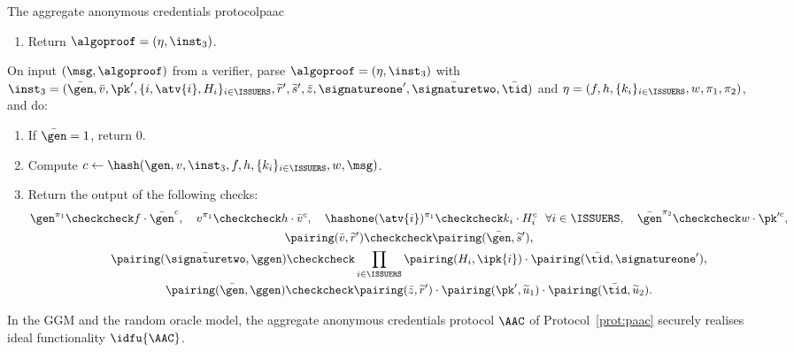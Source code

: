 \begin{protocolbox}{The aggregate anonymous credentials protocol}{paac}
\begin{description}
\begin{enumerate}
      \item Return $\algoproof = (\eta, \inst_3)$.

    \end{enumerate}

  \item[$\{0,1\} \leftarrow \AACverify(\crs,\msg,\algoproof)$ :] On input
$(\msg,\algoproof)$ from a verifier, parse $\algoproof = (\eta, \inst_3)$ with
$\inst_3 = (\bar{\gen}, \bar{v}, \pk', \{i, \atv{i}, H_i\}_{i\in\ISSUERS},
\widetilde{r}', \widetilde{s}', \bar{z}, \signatureone', \bar{\signaturetwo},
\bar{\tid})$ and $\eta = (f, h, \{k_i\}_{i \in \ISSUERS}, w, \pi_1, \pi_2)$, and do:

    \begin{enumerate}

      \item If $\bar{\gen} = 1$, return $0$.

      \item Compute $c \leftarrow \hash(\gen, v, \inst_3, f, h, \{k_i\}_{i \in
\ISSUERS}, w, \msg)$.

      \item Return the output of the following checks:
	\begin{gather*}
	  \gen^{\pi_1} \checkcheck f\cdot\bar{\gen}^c, \quad v^{\pi_1}
\checkcheck h\cdot\bar{v}^c, \quad \hashone(\atv{i})^{\pi_1} \checkcheck
k_i\cdot H_i^c \ \ \forall i \in \ISSUERS, \quad \bar{\gen}^{\pi_2}
\checkcheck w\cdot\pk'^c, \\
	  \pairing(\bar{v}, \widetilde{r}')\checkcheck \pairing(\bar{\gen},
\widetilde{s}'), \\
	  \pairing(\bar{\signaturetwo}, \ggen) \checkcheck \prod_{i\in
\ISSUERS}\pairing(H_i, \ipk{i})\cdot \pairing(\bar{\tid}, \signatureone'), \\
	  \pairing(\bar{\gen}, \ggen) \checkcheck \pairing(\bar{z},
\widetilde{r}')\cdot \pairing(\pk', \widetilde{u}_1)\cdot \pairing(\bar{\tid},
\widetilde{u}_2).
	\end{gather*}
    \end{enumerate}

\end{description}

\end{protocolbox}

\begin{theorem}\label{thm:agg-creds-thm-2}

    In the GGM and the random oracle model, the aggregate anonymous credentials
protocol $\AAC$ of Protocol~\ref{prot:paac} securely realises ideal functionality
$\idfu{\AAC}$.

\end{theorem}

